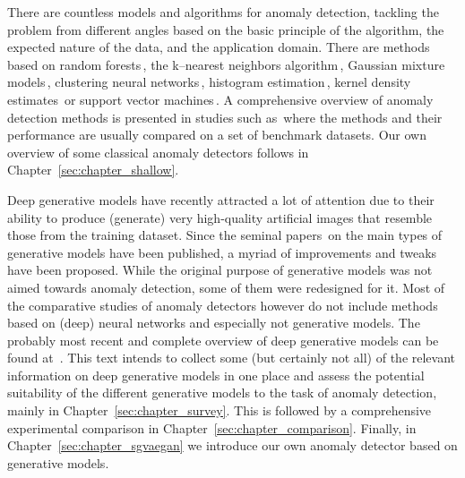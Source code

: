 There are countless models and algorithms for anomaly detection, tackling the problem from different angles based on the basic principle of the algorithm, the expected nature of the data, and the application domain. There are methods based on random forests\,\cite{liu2008isolation}, the k--nearest neighbors algorithm\,\cite{harmeling2006outliers}, Gaussian mixture models\,\cite{mahadevan2010anomaly}, clustering neural networks\,\cite{schlegl2017unsupervised}, histogram estimation\,\cite{pevny2016loda}, kernel density estimates\,\cite{latecki2007outlier} or support vector machines\,\cite{scholkopf2001estimating}. A comprehensive overview of anomaly detection methods is presented in studies such as\,\cite{pimentel2014review,goldstein2016comparative,lazarevic2003comparative,chandola2009anomaly,campos2016evaluation} where the methods and their performance are usually compared on a set of benchmark datasets. Our own overview of some classical anomaly detectors follows in Chapter~\ref{sec:chapter_shallow}.


Deep generative models have recently attracted a lot of attention due to their ability to produce (generate) very high-quality artificial images that resemble those from the training dataset. Since the seminal papers\,\cite{goodfellow2014gan,kingma2013vae,dinh2014nice} on the main types of generative models have been published, a myriad of improvements and tweaks have been proposed. While the original purpose of generative models was not aimed towards anomaly detection, some of them were redesigned for it. Most of the comparative studies of anomaly detectors however do not include methods based on (deep) neural networks and especially not generative models. The probably most recent and complete overview of deep generative models can be found at~\cite{ruff2020unifying}. This text intends to collect some (but certainly not all) of the relevant information on deep generative models in one place and assess the potential suitability of the different generative models to the task of anomaly detection, mainly in Chapter~\ref{sec:chapter_survey}. This is followed by a comprehensive experimental comparison in Chapter~\ref{sec:chapter_comparison}. Finally, in Chapter~\ref{sec:chapter_sgvaegan} we introduce our own anomaly detector based on generative models.

